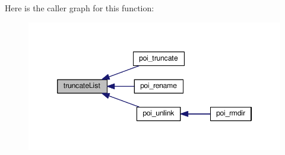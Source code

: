 Here is the caller graph for this function\-:\nopagebreak
\begin{figure}[H]
\begin{center}
\leavevmode
\includegraphics[width=346pt]{allocation-table_8c_a986965542b07562f2f205f9d68043a9c_icgraph}
\end{center}
\end{figure}


